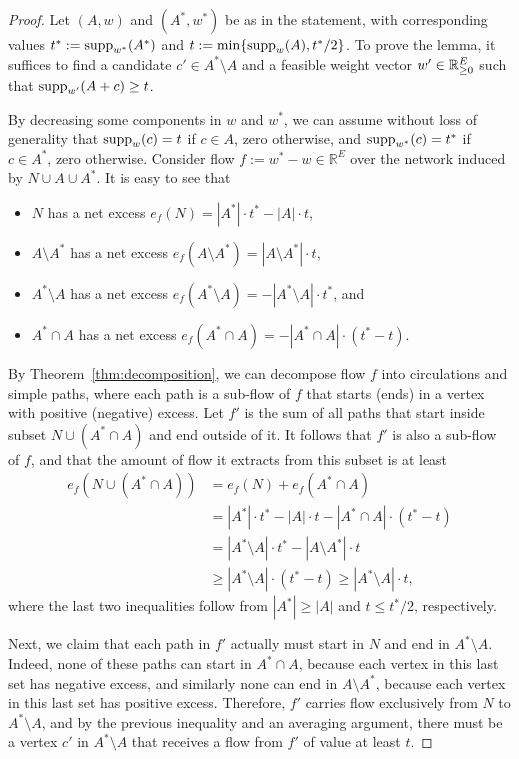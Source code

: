 \begin{proof}
Let $(A,w)$ and $(A^*, w^*)$ be as in the statement, with corresponding values $t^*:=\operatorname{supp}_{w^*}(A^*)$ and $t:=\min\{\operatorname{supp}_w(A), t^*/2\}$. To prove the lemma, it suffices to find a candidate $c'\in A^*\setminus A$ and a feasible weight vector $w'\in\mathbb{R}_{\geq 0}^E$ such that $\operatorname{supp}_{w'}(A+c)\geq t$.

By decreasing some components in $w$ and $w^*$, we can assume without loss of generality that $\operatorname{supp}_w(c)=t$ if $c\in A$, zero otherwise, and $\operatorname{supp}_{w^*}(c)=t^*$ if $c\in A^*$, zero otherwise. 
Consider flow $f:=w^* - w\in\mathbb{R}^E$ over the network induced by $N\cup A\cup A^*$. 
It is easy to see that 
\begin{itemize}
\item $N$ has a net excess $e_f(N)=|A^*|\cdot t^* - |A|\cdot t$,
\item $A\setminus A^*$ has a net excess $e_f(A\setminus A^*)=|A\setminus A^*|\cdot t$,
\item $A^*\setminus A$ has a net excess $e_f(A^*\setminus A)=-|A^*\setminus A|\cdot t^*$, and
\item $A^*\cap A$ has a net excess $e_f(A^*\cap A)=-|A^*\cap A| \cdot (t^*-t)$.
\end{itemize}

By Theorem~\ref{thm:decomposition}, we can decompose flow $f$ into circulations and simple paths, where each path is a sub-flow of $f$ that starts (ends) in a vertex with positive (negative) excess. 
Let $f'$ is the sum of all paths that start inside subset $N\cup (A^*\cap A)$ and end outside of it. 
It follows that $f'$ is also a sub-flow of $f$, and that the amount of flow it extracts from this subset is at least
\begin{align*}
e_f(N\cup(A^*\cap A)) &= e_f(N) + e_f(A^*\cap A)\\
&= |A^*|\cdot t^* - |A|\cdot t - |A^*\cap A| \cdot (t^*-t)\\
&= |A^*\setminus A|\cdot t^* - |A\setminus A^*|\cdot t \\
&\geq |A^*\setminus A|\cdot (t^*-t) \geq |A^*\setminus A|\cdot t,
\end{align*}
where the last two inequalities follow from $|A^*|\geq |A|$ and $t\leq t^*/2$, respectively.

Next, we claim that each path in $f'$ actually must start in $N$ and end in $A^*\setminus A$. 
Indeed, none of these paths can start in $A^*\cap A$, because each vertex in this last set has negative excess, and similarly none can end in $A\setminus A^*$, because each vertex in this last set has positive excess. 
Therefore, $f'$ carries flow exclusively from $N$ to $A^*\setminus A$, and by the previous inequality and an averaging argument, there must be a vertex $c'$ in $A^*\setminus A$ that receives a flow from $f'$ of value at least $t$. 


\end{proof}
